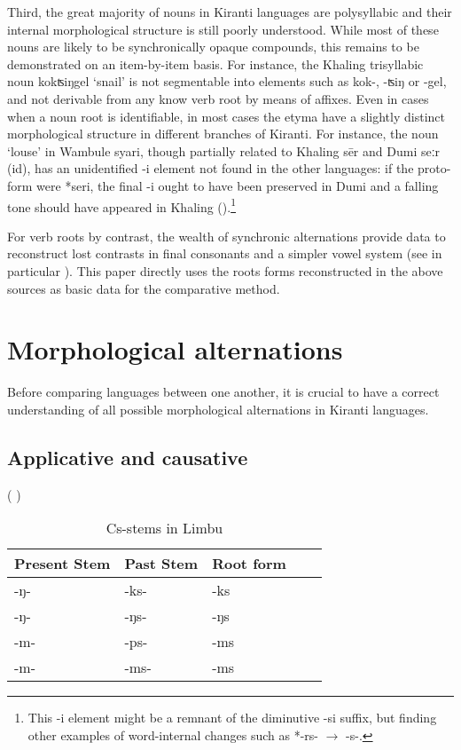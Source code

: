 \documentclass[oldfontcommands,oneside,a4paper,11pt]{article}
\newcommand{\ipa}[1]{{\phon\mbox{#1}}} %
\newcommand{\change}[2]{*\ipa{#1} $\rightarrow$ \ipa{#2}}
\begin{document}
Third, the great majority of nouns in Kiranti languages are polysyllabic and their internal morphological structure is still poorly understood. While most of these nouns are likely to be synchronically opaque compounds, this remains to be demonstrated on an item-by-item basis.  For instance, the Khaling trisyllabic noun \ipa{kokʦiŋgel} `snail' is not segmentable into elements such as \ipa{kok-}, \ipa{-ʦiŋ} or \ipa{-gel}, and not derivable from any know verb root by means of affixes. Even in cases when a noun root is identifiable, in most cases the etyma have a slightly distinct morphological structure in different branches of Kiranti. For instance, the noun `louse' in Wambule \ipa{syari}, though partially related to Khaling \ipa{sēr} and Dumi \ipa{seːr} (id), has an unidentified \ipa{-i} element not found in the other languages: if the proto-form were *\ipa{seri}, the final \ipa{-i} ought to have been preserved in Dumi and a falling tone should have appeared in Khaling (\citealt{jacques16tonogenesis}).\footnote{This \ipa{-i} element might be a remnant of the diminutive \ipa{-si} suffix, but finding other examples of word-internal changes such as \change{-rs-}{-s-}. }

For verb roots by contrast, the wealth of synchronic alternations provide data to reconstruct lost contrasts in final consonants and a simpler vowel system (see in particular \citealt{michailovsky02dico, jacques12khaling, michailovsky12dumi}). This paper directly uses the roots forms reconstructed in the above sources as basic data for the comparative method. 

\section{Morphological alternations} \label{sec:alternations}
Before comparing languages between one another, it is crucial to have a correct understanding of all possible morphological alternations in Kiranti languages. 

\subsection{Applicative and causative} \label{sec:appl}
\citet{michailovsky85dental}

(\citealt{driem87} \citealt[xiii]{michailovsky02dico}) 

\begin{table}[H]
\caption{Cs-stems in Limbu} \centering \label{tab:Cs.limbu}
\begin{tabular}{lllll}
\toprule
Present Stem & Past Stem & Root form \\
\midrule
\ipa{-ŋ-} & \ipa{-ks-} & \ipa{-ks} \\
\ipa{-ŋ-} & \ipa{-ŋs-} & \ipa{-ŋs} \\
\ipa{-m-} & \ipa{-ps-} & \ipa{-ms} \\
\ipa{-m-} & \ipa{-ms-} & \ipa{-ms} \\
\bottomrule
\end{tabular}
\end{table} 
\end{document}
